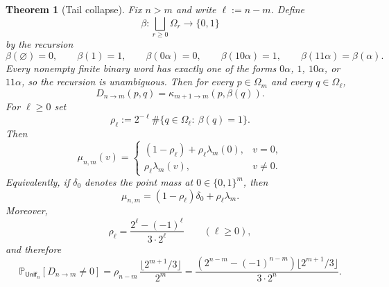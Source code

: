 \documentclass[11pt,reqno]{amsart}
\numberwithin{equation}{section}
\theoremstyle{plain}
\newtheorem{theorem}{Theorem}[section]
\theoremstyle{definition}
\theoremstyle{remark}
\newcommand{\PP}{\mathbb{P}}
\newcommand{\Unif}{\mathsf{Unif}}
\begin{document}
\begin{theorem}[Tail collapse]
\label{thm:tail-collapse}
Fix $n>m$ and write $\ell:=n-m$.  Define
\[
\beta:\bigsqcup_{r\ge 0}\Omega_r\longrightarrow\{0,1\}
\]
by the recursion
\[
\beta(\varnothing)=0,
\qquad
\beta(1)=1,
\qquad
\beta(0\alpha)=0,
\qquad
\beta(10\alpha)=1,
\qquad
\beta(11\alpha)=\beta(\alpha).
\]
Every nonempty finite binary word has exactly one of the forms $0\alpha$,
$1$, $10\alpha$, or $11\alpha$, so the recursion is unambiguous.
Then for every $p\in\Omega_m$ and every $q\in\Omega_\ell$,
\[
D_{n\to m}(p,q)=\kappa_{m+1\to m}(p,\beta(q)).
\]
For $\ell\ge 0$ set
\[
\rho_\ell:=2^{-\ell}\#\{q\in\Omega_\ell:\ \beta(q)=1\}.
\]
Then
\[
\mu_{n,m}(v)=
\begin{cases}
(1-\rho_\ell)+\rho_\ell\lambda_m(0),& v=0,\\[4pt]
\rho_\ell\lambda_m(v),& v\ne 0.
\end{cases}
\]
Equivalently, if $\delta_0$ denotes the point mass at $0\in\{0,1\}^m$, then
\[
\mu_{n,m}=(1-\rho_\ell)\delta_0+\rho_\ell\lambda_m.
\]
Moreover,
\[
\rho_\ell=\frac{2^\ell-(-1)^\ell}{3\cdot 2^\ell}
\qquad (\ell\ge 0),
\]
and therefore
\[
\PP_{\Unif_n}[D_{n\to m}\ne 0]
=
\rho_{n-m}\,\frac{\lfloor 2^{m+1}/3\rfloor}{2^m}
=
\frac{(2^{n-m}-(-1)^{n-m})\lfloor 2^{m+1}/3\rfloor}{3\cdot 2^n}.
\]
\end{theorem}
\end{document}
